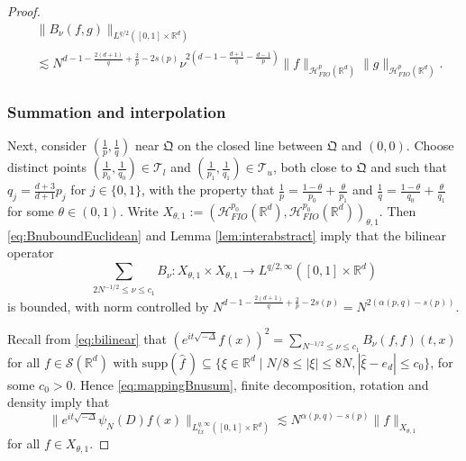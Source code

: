 \documentclass{amsart}
\numberwithin{equation}{section}
\theoremstyle{definition}
\newcommand{\R}{\mathbb{R}}
\newcommand{\Rd}{\mathbb{R}^{d}}
\newcommand{\Rn}{\mathbb{R}^{d}}
\newcommand {\HT}{\mathcal{H}}
\newcommand {\Hp}{\mathcal{H}^{p}_{FIO}(\R^d)}
\newcommand {\ud}{\mathrm{d}}
\newcommand {\Sw}{\mathcal{S}}
\newcommand {\supp}{\mathrm{supp}}
\newcommand {\wh}{\widehat}
\begin{document}
\begin{proof}
\begin{equation}\label{eq:BnuboundEuclidean}
\begin{aligned}
&\|B_{\nu}(f,g)\|_{L^{q/2}([0,1]\times\Rd)}\\
&\lesssim N^{d-1-\frac{2(d+1)}{q}+\frac{2}{p}-2s(p)} \nu^{2(d-1-\frac{d+1}{q}-\frac{d-1}{p})}\|f\|_{\Hp}\|g\|_{\Hp}.
\end{aligned}
\end{equation}

\subsubsection*{Summation and interpolation}

Next, consider $(\frac{1}{p},\frac{1}{q})$ near $\mathfrak{Q}$ on the closed line between $\mathfrak{Q}$ and $(0,0)$. %
Choose distinct points $(\frac{1}{p_{0}},\frac{1}{q_{0}})\in \mathcal{T}_{l}$ and $(\frac{1}{p_{1}},\frac{1}{q_{1}})\in \mathcal{T}_{u}$, both close to $\mathfrak{Q}$ and such that $q_{j}=\frac{d+3}{d+1}p_{j}$ for $j\in\{0,1\}$, with the property that $\frac{1}{p}=\frac{1-\theta}{p_{0}}+\frac{\theta}{p_{1}}$ and $\frac{1}{q}=\frac{1-\theta}{q_{0}}+\frac{\theta}{q_{1}}$ for some $\theta\in(0,1)$. Write $X_{\theta,1}:=(\HT^{p_{0}}_{FIO}(\Rd),\HT^{p_{0}}_{FIO}(\Rd))_{\theta,1}$. Then \eqref{eq:BnuboundEuclidean} and Lemma \ref{lem:interabstract} imply that the bilinear operator
\begin{equation}\label{eq:mappingBnusum}
\sum_{2N^{-1/2}\leq \nu\leq c_{1}}B_{\nu}:X_{\theta,1}\times X_{\theta,1}\to L^{q/2,\infty}([0,1]\times\Rd)
\end{equation}
is bounded, with norm controlled by $N^{d-1-\frac{2(d+1)}{q}+\frac{2}{p}-2s(p)}=N^{2(\alpha(p,q)-s(p))}$. 

Recall from \eqref{eq:bilinear} that 
$(e^{it\sqrt{-\Delta}}f(x))^{2}=\sum_{N^{-1/2}\leq \nu\leq c_{1}}B_{\nu}(f,f)(t,x)$ 
for all $f\in \Sw(\Rd)$ with $\supp(\wh{f}\,)\subseteq \{\xi\in\Rn\mid N/8\leq |\xi|\leq 8N, |\hat{\xi}-e_{d}|\leq c_{0}\}$, for some $c_{0}>0$. Hence \eqref{eq:mappingBnusum}, finite decomposition, rotation and density imply that
\begin{equation}\label{eq:restrictedatQ}
\|e^{it\sqrt{-\Delta}}\psi_{N}(D)f(x)\|_{L^{q,\infty}_{tx}([0,1]\times\Rd)}\lesssim N^{\alpha(p,q)-s(p)}\|f\|_{X_{\theta,1}}
\end{equation}
for all $f\in X_{\theta,1}$.



\end{proof}
\end{document}
